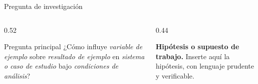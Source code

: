 \begin{frame}{Pregunta de investigación}
  \begin{columns}[T,onlytextwidth]
    \begin{column}{0.52\textwidth}
      \begin{UCBlock}{Pregunta principal}
        ¿Cómo influye \textit{variable de ejemplo} sobre \textit{resultado de ejemplo} en \textit{sistema o caso de estudio} bajo \textit{condiciones de análisis}?
      \end{UCBlock}
    \end{column}
    \begin{column}{0.44\textwidth}
      \begin{UCKeyPoint}
        \textbf{Hipótesis o supuesto de trabajo.} Inserte aquí la hipótesis, con lenguaje prudente y verificable.
      \end{UCKeyPoint}
    \end{column}
  \end{columns}
\end{frame}
